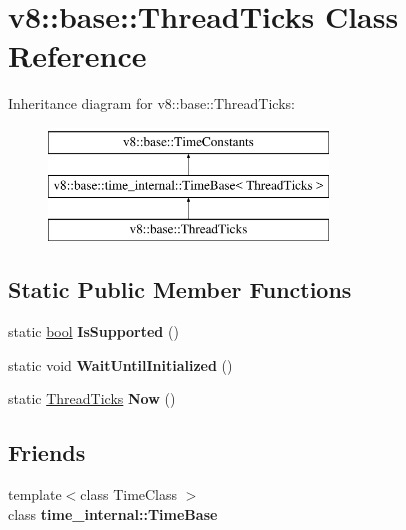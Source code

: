 \hypertarget{classv8_1_1base_1_1ThreadTicks}{}\section{v8\+:\+:base\+:\+:Thread\+Ticks Class Reference}
\label{classv8_1_1base_1_1ThreadTicks}
Inheritance diagram for v8\+:\+:base\+:\+:Thread\+Ticks\+:\begin{figure}[H]
\begin{center}
\leavevmode
\includegraphics[height=3.000000cm]{classv8_1_1base_1_1ThreadTicks}
\end{center}
\end{figure}
\subsection*{Static Public Member Functions}
\begin{DoxyCompactItemize}
\item 
\mbox{\label{classv8_1_1base_1_1ThreadTicks_a89eb96630497d044123bde1c3f8762c8}} 
static \mbox{\hyperlink{classbool}{bool}} {\bfseries Is\+Supported} ()
\item 
\mbox{\label{classv8_1_1base_1_1ThreadTicks_a276085bbcaaecdc29f0c73d20a92f75c}} 
static void {\bfseries Wait\+Until\+Initialized} ()
\item 
\mbox{\label{classv8_1_1base_1_1ThreadTicks_a8df52c0f32cab7a0984a3623ab769b40}} 
static \mbox{\hyperlink{classv8_1_1base_1_1ThreadTicks}{Thread\+Ticks}} {\bfseries Now} ()
\end{DoxyCompactItemize}
\subsection*{Friends}
\begin{DoxyCompactItemize}
\item 
\mbox{\label{classv8_1_1base_1_1ThreadTicks_ad62ea60a58e3469c74322f59c2dba4f0}} 
{\footnotesize template$<$class Time\+Class $>$ }\\class {\bfseries time\+\_\+internal\+::\+Time\+Base}
\end{DoxyCompactItemize}
